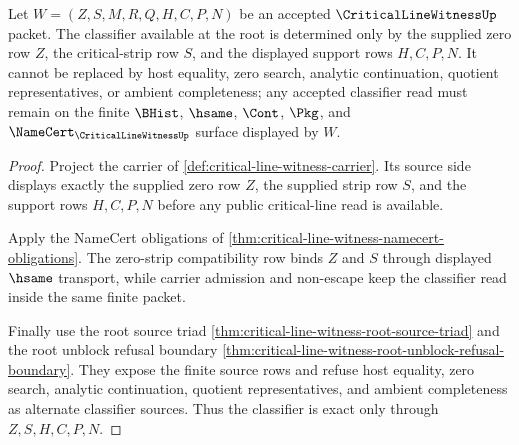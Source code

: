 \begin{theorem}
\label{thm:critical-line-witness-classifier-exactness}
Let $W=(Z,S,M,R,Q,H,C,P,N)$ be an accepted $\CriticalLineWitnessUp$ packet.
The classifier available at the root is determined only by the supplied zero
row $Z$, the critical-strip row $S$, and the displayed support rows
$H,C,P,N$. It cannot be replaced by host equality, zero search, analytic
continuation, quotient representatives, or ambient completeness; any
accepted classifier read must remain on the finite $\BHist$, $\hsame$,
$\Cont$, $\Pkg$, and $\NameCert_{\CriticalLineWitnessUp}$ surface displayed by
$W$.
\end{theorem}
\begin{proof}
Project the carrier of \autoref{def:critical-line-witness-carrier}. Its
source side displays exactly the supplied zero row $Z$, the supplied strip row
$S$, and the support rows $H,C,P,N$ before any public critical-line read is
available.

Apply the NameCert obligations of
\autoref{thm:critical-line-witness-namecert-obligations}. The zero-strip
compatibility row binds $Z$ and $S$ through displayed $\hsame$ transport, while
carrier admission and non-escape keep the classifier read inside the same
finite packet.

Finally use the root source triad
\autoref{thm:critical-line-witness-root-source-triad} and the root unblock
refusal boundary
\autoref{thm:critical-line-witness-root-unblock-refusal-boundary}. They expose
the finite source rows and refuse host equality, zero search, analytic
continuation, quotient representatives, and ambient completeness as alternate
classifier sources. Thus the classifier is exact only through
$Z,S,H,C,P,N$.
\end{proof}


